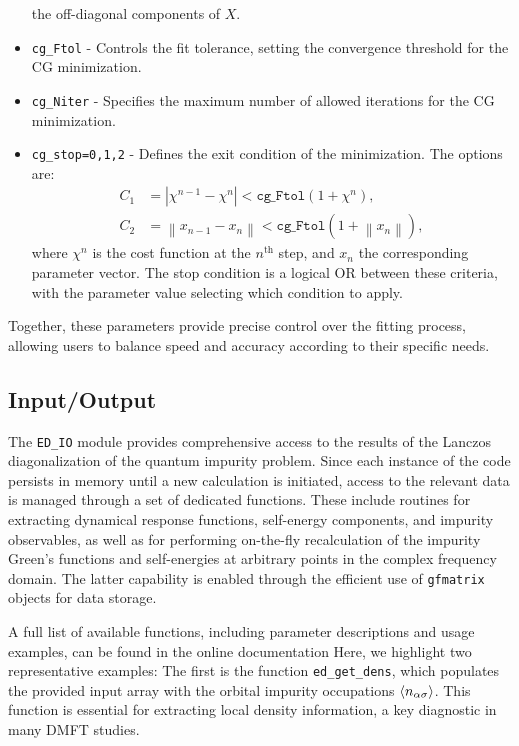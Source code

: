 \documentclass[edipack2.tex]{subfiles}
\begin{document}
\begin{itemize}
the off-diagonal components of $X$.
\item \texttt{cg\_Ftol} - Controls the fit tolerance, setting the 
convergence threshold for the CG minimization.
\item \texttt{cg\_Niter} - Specifies the maximum number of allowed 
iterations for the CG minimization.
\item \texttt{cg\_stop=0,1,2} - Defines the exit condition of the 
minimization. The options are:
\begin{align*}
C_1 & = |\chi^{n-1} - \chi^n| < \mathtt{cg\_Ftol} (1+\chi^n), \\
C_2 & = \left\|x_{n-1} - x_n\right\| < 
\mathtt{cg\_Ftol} (1+\left\|x_n\right\|),
\end{align*}
where $\chi^n$ is the cost function at the $n^\mathrm{th}$ step, and 
$x_n$ the corresponding parameter vector. The stop condition is a 
logical OR between these criteria, with the parameter value selecting 
which condition to apply.
\end{itemize}

Together, these parameters provide precise control over the fitting 
process, allowing users to balance speed and accuracy according to 
their specific needs.



\subsection{Input/Output}\label{sSecIO}
The \texttt{ED\_IO} module provides comprehensive access to the 
results of the Lanczos diagonalization of the quantum impurity 
problem. Since each instance of the code persists in memory until a 
new calculation is initiated, access to the relevant data is managed 
through a set of dedicated functions. These include routines for 
extracting dynamical response functions, self-energy components, and 
impurity observables, as well as for performing on-the-fly 
recalculation of the impurity Green's functions and self-energies at 
arbitrary points in the complex frequency domain. The latter 
capability is enabled through the efficient use of \texttt{gfmatrix} 
objects for data storage.

A full list of available functions, including parameter descriptions 
and usage examples, can be found in the online documentation 
Here, we highlight two representative examples:
The first is the function \texttt{ed\_get\_dens}, which populates the 
provided input array with the orbital impurity occupations 
$\langle n_{\alpha\sigma}\rangle$. This function is essential for extracting 
local density information, a key diagnostic in many DMFT studies.
\end{document}
